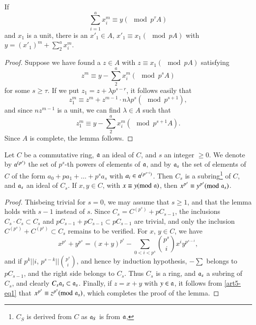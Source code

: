\begin{lem}\label{art5-lem2}
If 
$$
\sum\limits^a_{i=1} x^m_i \equiv y (\mod p^\tau A)
$$
and $x_1$ is a unit, there is an $x'_1 \in A$, $x'_1 \equiv x_1 (\mod p A)$ with $y = (x'_1)^m + \sum\limits^a_2 x^m_i$.
\end{lem}

\begin{proof}
Suppose we have found a $z \in A$ with $z \equiv x_1  (\mod p A)$ satisfying 
$$
z^m \equiv y - \sum\limits^a _2 x^m_i (\mod p^s A)
$$ 
for some $s \geq \tau$. If we put $z_1 = z + \lambda p^{s-r}$, it follows easily that 
$$
z^m_1 \equiv z^m + z^{m-1}\cdot n \lambda p^s (\mod p^{s+1}),
$$
and since $nz^{m-1}$ is a unit, we can find $\lambda \in A$ such that 
$$
z^m_1 \equiv y - \sum\limits^{a}_2 x^m_i (\mod p^{s+1} A).
$$
Since $A$ is complete, the lemma follows.
\end{proof}

\begin{lem}\label{art5-lem3}
Let $C$ be a commutative ring, $\mathfrak{a}$ an ideal of $C$, and $s$ an integer $\geq 0$. We denote by $\mathfrak{a}^{(p^s)}$ the set of $p^{s}$-th powers of elements of $\mathfrak{a}$, and by $\mathfrak{a}_s$ the set of elements of $C$ of the form $a_0+ pa_1 + \ldots + p^s a_s$ with $a_i\in \mathfrak{a}^{(p^{s-i})}$. Then $C_s$ is a subring\footnote{$C_S$ is derived from $C$ as $\mathfrak{a}_S$ is from $\mathfrak{a}$,} of $C$, and $\mathfrak{a}_s$ an ideal of $C_s$. If $x, y \in C$, with $x \equiv y ({\rm{mod}}\kern.3em \mathfrak{a})$, then $x^{p^s} \equiv y^{p^s} ({\rm{mod}}\kern.3em \mathfrak{a}_s)$.
\end{lem}

\begin{proof}
This\pageoriginale being trivial for $s = 0$, we may assume that $s \geq 1$, and that the lemma holds with $s-1$ instead of $s$. Since $C_s = C^{(p^s)} + p C_{s-1}$, the inclusions $C_s \cdot C_s \subset C_s$ and $p C_{s-1} + p C_{s-1} \subset p C_{s-1}$ are trivial, and only the inclusion $C^{(p^s)} + C^{(p^s)} \subset C_s$ remains to be verified. For $x$, $y \in C$, we have 
\begin{equation}
x^{p^s} + y^{p^s} = (x+y)^{p^s} - \sum\limits_{0< i < p^s} \binom{p^s}{i}  x^i y^{p^{s-i} }, \label{art5-eq1}
\end{equation}
and if $p^k || i$, $p^{s-k} || \binom{p^s}{i}$, and hence by induction hypothesis, $-\sum$ belongs  to $pC_{s-1}$, and the right side belongs to $C_s$. Thus $C_s$ is a ring, and $\mathfrak{a}_s$ a subring of $C_s$, and clearly $C_s \mathfrak{a}_s \subset \mathfrak{a}_s$. Finally, if $z = x + y$ with $y \in \mathfrak{a}$, it follows from \eqref{art5-eq1} that $x^{p^s} \equiv z^{p^s} ({\rm{mod}}\kern.3em \mathfrak{a}_s)$, which completes the proof of the lemma.
\end{proof}

